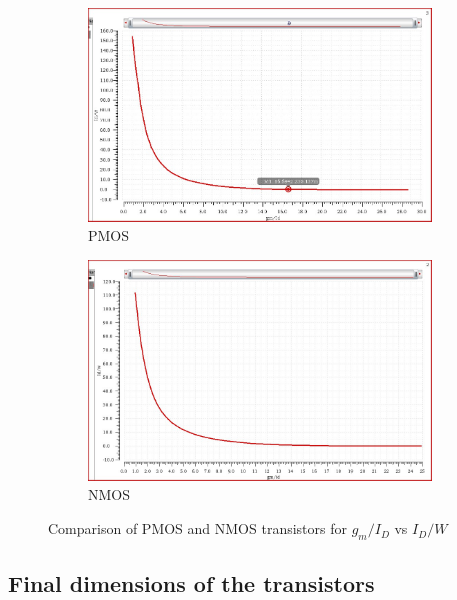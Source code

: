 \begin{figure}[ht!]
\centering
\begin{subfigure}[b]{0.85\linewidth}
\includegraphics[width = \textwidth]{images/Id_w_vs_gm_id_pmos.jpg}
\caption{PMOS}
\label{fig:gm_pmos}
\end{subfigure}

\begin{subfigure}[b]{0.85\linewidth}
\includegraphics[width = \textwidth]{images/gm_id_w_nmos.jpg}
\caption{NMOS}
\label{fig:gm_nmos}
\end{subfigure}

\caption{Comparison of PMOS and NMOS transistors for $g_m/I_D$ vs $I_D/W$}
\label{fig:comp_pmos_nmos}
\end{figure}


\subsection{Final dimensions of the transistors}

